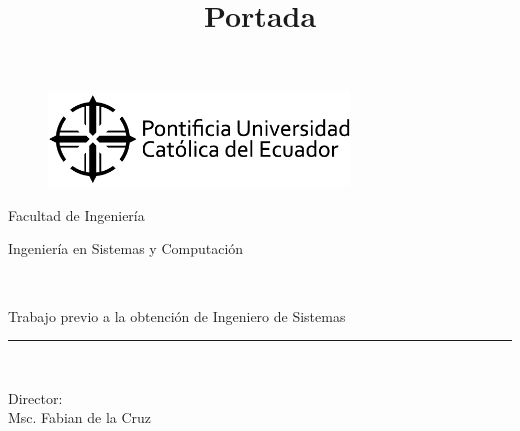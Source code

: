 \title{Portada}
\begin{titlepage}
	\begin{center}
		\vspace*{-1in}
		\begin{figure}[htb]
			\begin{center}
				\includegraphics[width=8cm]{./logos/puce.png}
			\end{center}
		\end{figure}
		Facultad de Ingeniería\\
		\vspace*{0.18in}
		\vspace*{0.6in}
		\begin{large}
			Ingeniería en Sistemas y Computación\\
		\end{large}
		\vspace*{0.2in}
		\begin{Large}
			\textbf{\tituloTesis} \\
		\end{Large}
		\vspace*{0.3in}
		\begin{large}
			Trabajo previo a la obtención de Ingeniero de Sistemas\\
		\end{large}
		\vspace*{0.3in}
		\rule{80mm}{0.1mm}\\
		\vspace*{0.1in}
		\begin{large}
			Director: \\
			Msc. Fabian de la Cruz \\
		\end{large}
	\end{center}
\end{titlepage}